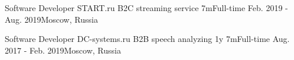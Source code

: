 \begin{cventries}
  \cventry
    {Software Developer} %
    {} %
    {START.ru} %
    {B2C streaming service} %
    {7m{\enskip\cdotp\enskip}Full-time} %
    {Feb. 2019 - Aug. 2019{\enskip\cdotp\enskip}Moscow, Russia} %
    {}

  \cventry
    {Software Developer} %
    {} %
    {DC-systems.ru} %
    {B2B speech analyzing} %
    {1y 7m{\enskip\cdotp\enskip}Full-time} %
    {Aug. 2017 - Feb. 2019{\enskip\cdotp\enskip}Moscow, Russia} %
    {}

\end{cventries}
